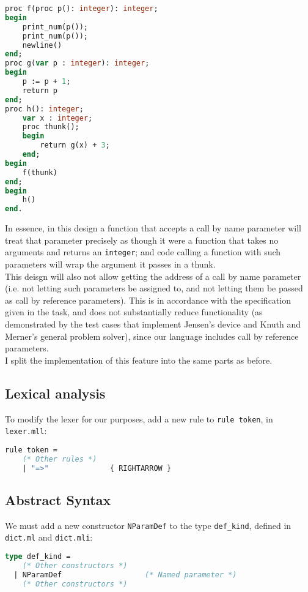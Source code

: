 \documentclass[a4paper,10pt]{article}
\begin{document}
\begin{lstlisting}[language=pascal, style=pascal, frame=single]
proc f(proc p(): integer): integer;
begin
    print_num(p());
    print_num(p());
    newline()
end;
proc g(var p : integer): integer;
begin
    p := p + 1;
    return p
end;
proc h(): integer;
    var x : integer;
    proc thunk();
    begin
        return g(x) + 3;
    end;
begin
    f(thunk)
end;
begin
    h()
end.
\end{lstlisting}
In essence, in this design a function that accepts a call by name parameter will treat that parameter precisely as though it were a function that takes no arguments and returns an \texttt{integer}; and code calling a function with such parameters will wrap the argument it passes in a thunk. \\
This deisgn will also not allow getting the address of a call by name parameter (i.e. not letting such parameters be assigned to, and not letting them be passed as call by reference parameters). This is in accordance with the specification given in the task, and does not substantially reduce functionality (as demonstrated by the test cases that implement Jensen's device and Knuth and Merner's general problem solver), since our language includes call by reference parameters. \\
I split the implementation of this feature into the same parts as before.

\subsection{Lexical analysis}
To modify the lexer for our purposes, add a new rule to \texttt{rule token}, in \texttt{lexer.mll}:
\begin{lstlisting}[language=ml]
rule token =
    (* Other rules *)
    | "=>"              { RIGHTARROW }
\end{lstlisting}

\subsection{Abstract Syntax}
We must add a new constructor \texttt{NParamDef} to the type \texttt{def\_kind}, defined in \texttt{dict.ml} and \texttt{dict.mli}:
\begin{lstlisting}[language=ml]
type def_kind = 
    (* Other constructors *)
  | NParamDef                   (* Named parameter *)
    (* Other constructors *)
\end{lstlisting}
\end{document}
